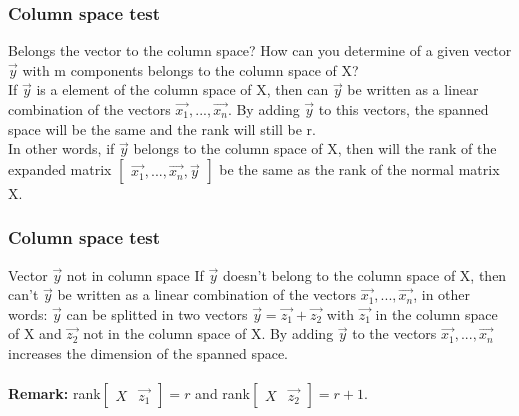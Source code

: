 \begin{frame}
	\frametitle{Column space test}
	\begin{block}{Belongs the vector to the column space?}
		How can you determine of a given vector $\overrightarrow{y}$ with m components belongs to the column space of X?\\
		 If $\overrightarrow{y}$ is a element of the column space of X, then can $\overrightarrow{y}$ be written as a linear combination of the vectors $\overrightarrow{x_1},...,\overrightarrow{x_n}$. By adding $\overrightarrow{y}$ to this vectors, the spanned space will be the same and the rank will still be r. \\
		In other words, if $\overrightarrow{y}$ belongs to the column space of X, then will the rank of the expanded matrix $\begin{bmatrix} \overrightarrow{x_1},...,\overrightarrow{x_n},\overrightarrow{y}\end{bmatrix}$
		be the same as the rank of the normal matrix X.\\
		\vspace{4mm}
	\end{block}
\end{frame}

\begin{frame}
	\frametitle{Column space test}
	\begin{block}{Vector $\overrightarrow{y}$ not in column space}
		If $\overrightarrow{y}$ doesn't belong to the column space of X, then can't $\overrightarrow{y}$ be written as a linear combination of the vectors $\overrightarrow{x_1},...,\overrightarrow{x_n}$, in other words: $\overrightarrow{y}$ can be splitted in two vectors $\overrightarrow{y}=\overrightarrow{z_1}+\overrightarrow{z_2}$ with $\overrightarrow{z_1}$ in the column space of X and $\overrightarrow{z_2}$ not in the column space of X. By adding $\overrightarrow{y}$ to the vectors $\overrightarrow{x_1},...,\overrightarrow{x_n}$ increases the dimension of the spanned space.\\
		\vspace{4mm}
		\\
	\vspace{4mm}
	{\bf Remark:} rank$\begin{bmatrix} X & \overrightarrow{z_1} \end{bmatrix} =r$ and rank$\begin{bmatrix} X & \overrightarrow{z_2} \end{bmatrix} =r+1$.
	\end{block}
\end{frame}

